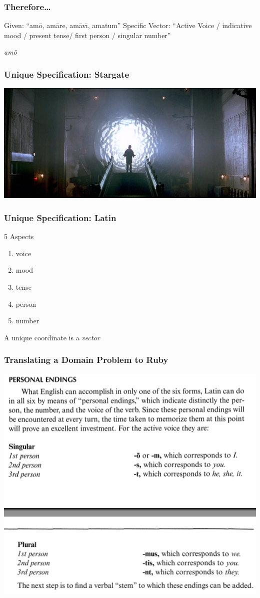 \documentclass[slidestop,compress,mathserif]{beamer}
\begin{document}
\begin{frame}
	\frametitle{Therefore\ldots}
	Given:  ``am\={o}, am\={a}re, am\={a}v\={\i}, amatum''
	\vskip 0.5cm
	Specific Vector: ``Active Voice / indicative mood / present tense/ first person / singular number'' 
	\vskip 0.5cm
	\begin{center}
		\emph{am\={o}}
	\end{center}
\end{frame}

\begin{frame}
	\frametitle{Unique Specification:  Stargate}
	\includegraphics[scale=0.25]{img/stargate.jpg}
	\vskip 0.5cm
\end{frame}

\begin{frame}
	\frametitle{Unique Specification:  Latin}
	5 Aspects
	\begin{enumerate}
		\item voice
		\pause
		\item mood
		\pause
		\item tense
		\pause
		\item person
		\pause
		\item number
		\pause
	\end{enumerate}
	\vskip 0.5cm
	A unique coordinate is a \emph{vector}
\end{frame}

\begin{frame}
	\frametitle{Translating a Domain Problem to Ruby} 
	\includegraphics[scale=0.45]{img/conj_how_1.png}
\end{frame}
\end{document}

